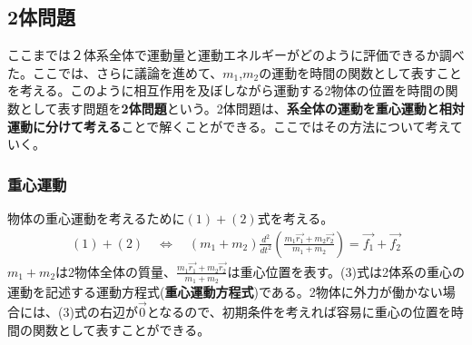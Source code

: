 \documentclass[dvipdfmx,11pt]{jsarticle}
\begin{document}
\subsection*{2体問題}
ここまでは２体系全体で運動量と運動エネルギーがどのように評価できるか調べた。ここでは、さらに議論を進めて、$m_1$,$m_2$の運動を時間の関数として表すことを考える。このように相互作用を及ぼしながら運動する2物体の位置を時間の関数として表す問題を{\bf 2体問題}という。2体問題は、{\bf 系全体の運動を重心運動と相対運動に分けて考える}ことで解くことができる。ここではその方法について考えていく。

\subsubsection*{重心運動}
物体の重心運動を考えるために$(1)+(2)$式を考える。
{\large
\begin{eqnarray}
    (1)+(2)\quad\Longleftrightarrow\quad(m_1+m_2)\frac{d^2}{dt^2}\left(\frac{m_1\vec{r_1}+m_2\vec{r_2}}{m_1+m_2}\right)=\vec{f_1}+\vec{f_2}
\end{eqnarray}
}
$m_1+m_2$は2物体全体の質量、$\frac{m_1\vec{r_1}+m_2\vec{r_2}}{m_1+m_2}$は重心位置を表す。(3)式は2体系の重心の運動を記述する運動方程式({\bf 重心運動方程式})である。2物体に外力が働かない場合には、(3)式の右辺が$\vec{0}$となるので、初期条件を考えれば容易に重心の位置を時間の関数として表すことができる。
\end{document}
